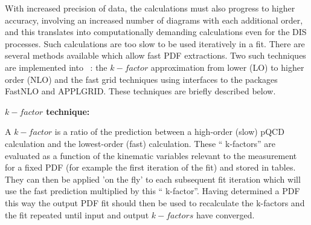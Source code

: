 
With increased precision of data, the calculations must also progress to higher accuracy, involving an increased number of diagrams with each 
additional order, and this translates into computationally demanding 
calculations even for the DIS processes. Such calculations 
are too slow to be used iteratively in a fit.
There are several methods available which allow fast PDF extractions.  
Two such techniques
are implemented into \fitter\ : the $k-factor$ approximation from lower (LO) to higher order (NLO) and the fast grid techniques using interfaces to the 
packages FastNLO and APPLGRID. These techniques are briefly described below.  


\begin{description}
\item \bf {$k-factor$ technique:} \rm

A $k-factor$ is a ratio of the prediction between a high-order (slow)
pQCD calculation and the lowest-order (fast) calculation.  These `` k-factors''
are evaluated as a function of the kinematic variables relevant to
 the measurement 
for a fixed PDF (for example the first iteration of the fit) and stored in 
tables. They can then be applied 'on the fly' to each subsequent fit 
iteration which will use the fast prediction multiplied by this `` k-factor''.
Having determined a PDF this way the output PDF fit should then be used to 
recalculate the k-factors and the fit repeated until input and output 
$k-factors$ have converged. 


\end{description}
